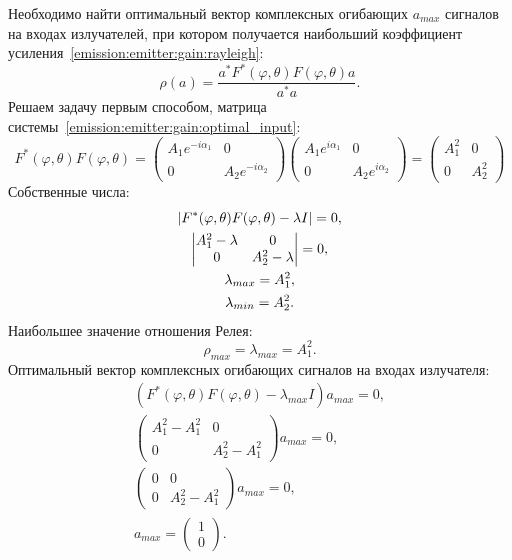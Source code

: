 Необходимо найти оптимальный вектор комплексных огибающих $a_{max}$ сигналов на входах излучателей, при котором получается наибольший коэффициент
усиления~\eqref{emission:emitter:gain:rayleigh}:
\[
    \rho(a)
    = \frac{a^* F^*(\varphi, \theta) F(\varphi, \theta) a}{a^* a}.
\]
Решаем задачу первым способом, матрица системы~\eqref{emission:emitter:gain:optimal_input}:
\[
    F^*(\varphi, \theta) F(\varphi, \theta)
    =
    \begin{pmatrix}
        A_1 e^{-i \alpha_1} & 0                   \\
        0                   & A_2 e^{-i \alpha_2}
    \end{pmatrix}
    \begin{pmatrix}
        A_1 e^{i \alpha_1} & 0                  \\
        0                  & A_2 e^{i \alpha_2}
    \end{pmatrix}
    =
    \begin{pmatrix}
        A_1^2 & 0     \\
        0     & A_2^2
    \end{pmatrix}
\]
Собственные числа:
\begin{gather*}
    \left | F^*(\varphi, \theta) F(\varphi, \theta) - \lambda I \right | = 0 , \\
    \begin{vmatrix}
        A_1^2 - \lambda & 0               \\
        0               & A_2^2 - \lambda
    \end{vmatrix}
    = 0 , \\
    \lambda_{max} = A_1^2 , \\
    \lambda_{min} = A_2^2 .
\end{gather*}
Наибольшее значение отношения Релея:
\[
    \rho_{max} = \lambda_{max} = A_1^2 .
\]
Оптимальный вектор комплексных огибающих сигналов на входах излучателя:
\begin{gather*}
    ( F^*(\varphi, \theta) F(\varphi, \theta) - \lambda_{max} I ) a_{max} = 0 , \\
    \begin{pmatrix}
        A_1^2 - A_1^2 & 0             \\
        0             & A_2^2 - A_1^2
    \end{pmatrix}
    a_{max} = 0 , \\
    \begin{pmatrix}
        0 & 0             \\
        0 & A_2^2 - A_1^2
    \end{pmatrix}
    a_{max} = 0 , \\
    a_{max}
    = \begin{pmatrix}
        1 \\
        0
    \end{pmatrix} .
\end{gather*}
